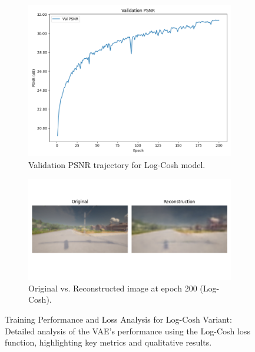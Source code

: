 \begin{figure}[htbp]
    \begin{subfigure}[b]{0.45\textwidth}
        \includegraphics[width=\textwidth]{img/vae_results/200_epochs_128_ls_logcosh/logcosh_val_psnr.png}
        \caption{Validation PSNR trajectory for Log-Cosh model.}
        \label{fig:logcosh_psnr}
    \end{subfigure}
    \hfill
    \begin{subfigure}[b]{0.45\textwidth}
        \includegraphics[width=\textwidth]{img/vae_results/200_epochs_128_ls_logcosh/reconstructions/epoch_200.png}
        \caption{Original vs. Reconstructed image at epoch 200 (Log-Cosh).}
        \label{fig:logcosh_epoch200}
    \end{subfigure}
    
    \caption{Training Performance and Loss Analysis for Log-Cosh Variant: Detailed analysis of the VAE's performance using the Log-Cosh loss function, highlighting key metrics and qualitative results.}
    \label{fig:logcosh_analysis}
\end{figure}




